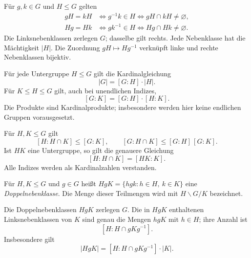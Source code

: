 \begin{theorem}[Nebenklassenkriterien]
Für \(g,k\in G\) und \(H\leq G\) gelten
\[
 \begin{aligned}
 gH=kH&\iff g^{-1}k\in H
       \iff gH\cap kH\ne\varnothing,\\
 Hg=Hk&\iff gk^{-1}\in H
       \iff Hg\cap Hk\ne\varnothing.
 \end{aligned}
\]
Die Linksnebenklassen zerlegen \(G\); dasselbe gilt rechts.
Jede Nebenklasse hat die Mächtigkeit \(|H|\).
Die Zuordnung \(gH\mapsto Hg^{-1}\) verknüpft linke und rechte
Nebenklassen bijektiv. \cite{milne}
\end{theorem}

\begin{theorem}
Für jede Untergruppe \(H\leq G\) gilt die Kardinalgleichung
\[
 |G|=[G:H]\cdot|H|.
\]
Für \(K\leq H\leq G\) gilt, auch bei unendlichen Indizes,
\[
 [G:K]=[G:H]\cdot[H:K].
\]
Die Produkte sind Kardinalprodukte; insbesondere werden hier keine
endlichen Gruppen vorausgesetzt. \cite{milne}
\end{theorem}

\begin{theorem}
Für \(H,K\leq G\) gilt
\[
 [H:H\cap K]\leq[G:K],\qquad
 [G:H\cap K]\leq[G:H]\,[G:K].
\]
Ist \(HK\) eine Untergruppe, so gilt die genauere Gleichung
\[
 [H:H\cap K]=[HK:K].
\]
Alle Indizes werden als Kardinalzahlen verstanden. \cite{milne}
\end{theorem}

\begin{definition}[Doppelnebenklasse]
Für \(H,K\leq G\) und \(g\in G\) heißt
\(HgK=\{hgk:h\in H,\ k\in K\}\) eine \emph{Doppelnebenklasse}.
Die Menge dieser Teilmengen wird mit \(H\backslash G/K\) bezeichnet.
\end{definition}

\begin{theorem}[Doppelnebenklassenzerlegung]
Die Doppelnebenklassen \(HgK\) zerlegen \(G\).
Die in \(HgK\) enthaltenen Linksnebenklassen von \(K\) sind genau die
Mengen \(hgK\) mit \(h\in H\); ihre Anzahl ist
\[
 [H:H\cap gKg^{-1}].
\]
Insbesondere gilt
\[
 |HgK|=[H:H\cap gKg^{-1}]\cdot|K|.
\]
\cite{milne,conradconj}
\end{theorem}
